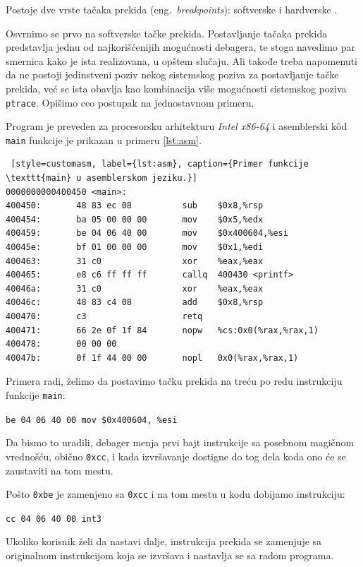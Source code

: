 \documentclass[12pt,oneside]{memoir}
\begin{document}
Postoje dve vrste tačaka prekida (eng.~\emph{breakpoints}): softverske i hardverske \cite{GDB}.

Osvrnimo se prvo na softverske tačke prekida. Postavljanje tačaka prekida predstavlja jednu od najkorišćenijih mogućnosti debagera, te stoga navedimo par smernica kako je ista realizovana, u opštem slučaju. Ali takođe treba napomenuti da ne postoji jedinstveni poziv nekog sistemskog poziva za postavljanje tačke prekida, već se ista obavlja kao kombinacija više mogućnosti  sistemskog poziva \texttt{ptrace}. Opišimo ceo postupak na jednostavnom primeru.

Program je preveden za procesorsku arhitekturu \emph{Intel x86-64} i asemblerski k\^{o}d \texttt{main} funkcije je prikazan u primeru \ref{lst:asm}.\newpage
\begin{lstlisting} [style=customasm, label={lst:asm}, caption={Primer funkcije \texttt{main} u asemblerskom jeziku.}]
0000000000400450 <main>:
400450:       48 83 ec 08          sub    $0x8,%rsp
400454:       ba 05 00 00 00       mov    $0x5,%edx
400459:       be 04 06 40 00       mov    $0x400604,%esi
40045e:       bf 01 00 00 00       mov    $0x1,%edi
400463:       31 c0                xor    %eax,%eax
400465:       e8 c6 ff ff ff       callq  400430 <printf>
40046a:       31 c0                xor    %eax,%eax
40046c:       48 83 c4 08          add    $0x8,%rsp
400470:       c3                   retq   
400471:       66 2e 0f 1f 84       nopw   %cs:0x0(%rax,%rax,1)
400478:       00 00 00 
40047b:       0f 1f 44 00 00       nopl   0x0(%rax,%rax,1)

\end{lstlisting}


Primera radi, želimo da postavimo tačku prekida na treću po redu instrukciju funkcije \texttt{main}:

\texttt{be 04 06 40 00  mov \$0x400604, \%esi}

Da bismo to uradili, debager menja prvi bajt instrukcije sa posebnom magičnom vrednošću, obično \texttt{0xcc}, i kada izvršavanje dostigne do tog dela koda ono će se zaustaviti na tom mestu.

Pošto \texttt{0xbe} je zamenjeno sa \texttt{0xcc} i na tom mestu u kodu dobijamo instrukciju:

\texttt{cc 04 06 40 00  int3}

Ukoliko korisnik želi da nastavi dalje, instrukcija prekida se zamenjuje sa originalnom instrukcijom koja se izvršava i nastavlja se sa radom programa.
\end{document}
